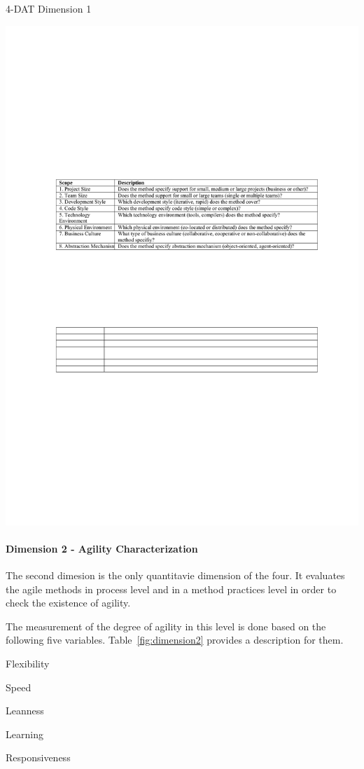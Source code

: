 \begin{table}[H]
\caption{4-DAT Dimension 1}
\label{fig:dimension1}
\centerline{\includegraphics[scale=0.8]{include/relatedwork/fig/qumer_dimension1.pdf}}
\end{table}

\paragraph{Dimension 2 - Agility Characterization}
The second dimesion is the only quantitavie dimension of the four. It evaluates the agile methods in process level and in a method practices level in order to check the existence of agility.

The measurement of the degree of agility in this level is done based on the following five variables. Table~\ref{fig:dimension2} provides a description for them.
\begin{inparaenum} [a\upshape)]
\item Flexibility
\item Speed
\item Leanness
\item Learning
\item Responsiveness
\end{inparaenum}

